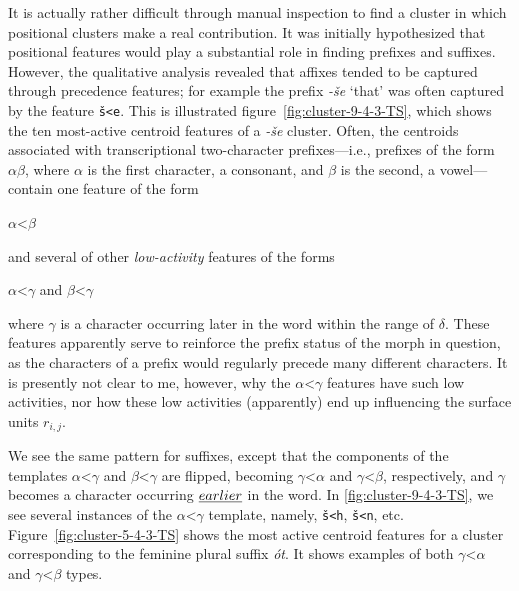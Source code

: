 It is actually rather difficult through manual inspection to find a cluster in which positional clusters make a real contribution. 
It was initially hypothesized that positional features would play a substantial role in
finding prefixes and suffixes. However, the qualitative analysis revealed that affixes tended to be captured through 
precedence features; for example the prefix \textit{-\v{s}e} `that'  was often captured by the feature \texttt{\v{s}<e}. This is illustrated figure~\ref{fig:cluster-9-4-3-TS}, which shows the ten most-active centroid features of a \textit{-\v{s}e} cluster.
 Often, the centroids associated with transcriptional two-character prefixes---i.e., prefixes of the form
$\alpha\beta$,
where $\alpha$ is the first character, a consonant, and $\beta$ is the second, a vowel---
contain one feature of the form 
\begin{center}
$\alpha$<$\beta$ 
\end{center}
and several of other \emph{low-activity} features
of the forms 
\begin{center}
$\alpha$<$\gamma$ \quad and \quad $\beta$<$\gamma$  
\end{center}
where $\gamma$ is a character occurring later in the word within the range of $\delta$. These features apparently serve to reinforce the prefix status of the morph in question, as the characters of a prefix would regularly precede many different characters. It is presently not clear to me, however, why the $\alpha$<$\gamma$ features have such low activities, nor how these low activities (apparently) end up influencing the surface units $r_{i,j}$.

We see the same pattern for suffixes, except that the components of the templates $\alpha$<$\gamma$ and $\beta$<$\gamma$ are flipped, becoming $\gamma$<$\alpha$ and $\gamma$<$\beta$, respectively, and $\gamma$ becomes a character occurring $\emph{earlier}$ in the word. In \ref{fig:cluster-9-4-3-TS}, we see several instances of the $\alpha$<$\gamma$ template, namely, \texttt{\v{s}<h}, \texttt{\v{s}<n}, etc. Figure~\ref{fig:cluster-5-4-3-TS} shows the most active centroid features for a cluster corresponding to the feminine plural suffix \textit{\'{o}t}. It shows examples of both $\gamma$<$\alpha$ and $\gamma$<$\beta$ types.


